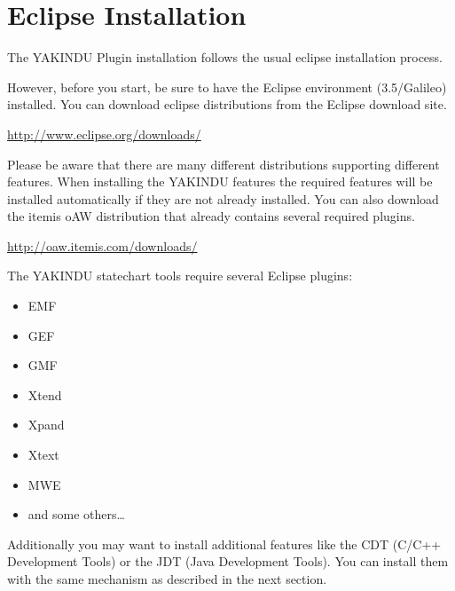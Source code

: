 %
\section{Eclipse Installation}

The YAKINDU Plugin installation follows the usual eclipse installation process.

However, before you start, be sure to have the Eclipse environment (3.5/Galileo)
installed. You can download eclipse distributions from the Eclipse download site.

\url{http://www.eclipse.org/downloads/}

Please be aware that there are many different distributions supporting different
features. When installing the YAKINDU features the required features will be
installed automatically if they are not already installed. You can also download
the itemis oAW distribution that already contains several required plugins.

\url{http://oaw.itemis.com/downloads/}

The YAKINDU statechart tools require several Eclipse plugins:

\begin{itemize}
\item EMF
\item GEF
\item GMF
\item Xtend
\item Xpand
\item Xtext
\item MWE
\item and some others\dots
\end{itemize}

Additionally you may want to install additional features like the CDT (C/C++
Development Tools) or the JDT (Java Development Tools). You can install them with
the same mechanism as described in the next section.

